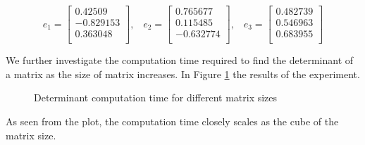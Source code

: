 \documentclass{article}
\begin{document}
$$
e_{1} = \begin{bmatrix}
     0.42509 \\[0.3em]
     -0.829153 \\[0.3em]
     0.363048 \\[0.3em]
       \end{bmatrix}\text{,}\quad
e_{2} = \begin{bmatrix}
     0.765677 \\[0.3em]
     0.115485 \\[0.3em]
     -0.632774 \\[0.3em]
       \end{bmatrix}\text{,}\quad
e_{3} = \begin{bmatrix}
     0.482739 \\[0.3em]
     0.546963 \\[0.3em]
     0.683955 \\[0.3em]
       \end{bmatrix}
$$

We further investigate the computation time required to find the determinant of a matrix as the size of matrix increases. In Figure \ref{fig:det_plot}
the results of the experiment.

\begin{figure}[H]
  \begin{center}
  \end{center}
  \caption{Determinant computation time for different matrix sizes}
  \label{fig:det_plot}
\end{figure}

As seen from the plot, the computation time closely scales as the cube of the matrix size.
\end{document}
